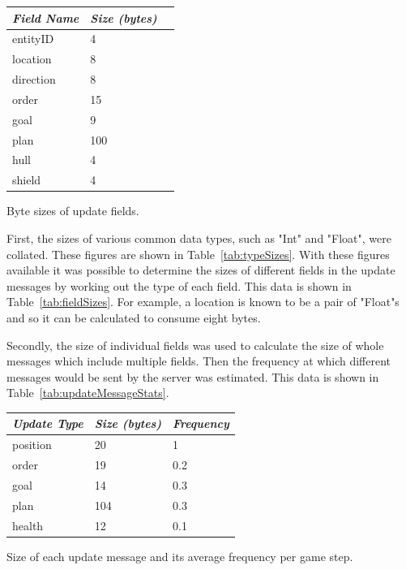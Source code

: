 \begin{margintable}
    \begin{tabular}{p{5em} p{5em} p{5em}}
    \toprule
    \emph{Field Name} & \emph{Size (bytes)} \\
    \midrule
    entityID & 4 \\ 
    location & 8 \\
    direction & 8 \\ 
    order & 15 \\
    goal & 9 \\ 
    plan & 100 \\ 
    hull & 4  \\ 
    shield & 4  \\  
    \bottomrule
    \end{tabular}
    	\vspace{1em}
	\caption[Byte sizes of update fields]{Byte sizes of update fields.}
	\label{tab:fieldSizes}
\end{margintable}

First, the sizes of various common data types, such as "Int" and "Float", were collated. These figures are shown in Table~\ref{tab:typeSizes}. With these figures available it was possible to determine the sizes of different fields in the update messages by working out the type of each field. This data is shown in Table~\ref{tab:fieldSizes}. For example, a location is known to be a pair of "Float"s and so it can be calculated to consume eight bytes.


Secondly, the size of individual fields was used to calculate the size of whole messages which include multiple fields. Then the frequency at which different messages would be sent by the server was estimated. This data is shown in Table~\ref{tab:updateMessageStats}.

\begin{margintable}
    \begin{tabular}{p{5em} p{5em} p{5em}}
    \toprule
    \emph{Update Type} & \emph{Size (bytes)} & \emph{Frequency} \\
    \midrule
    position & 20 & 1 \\ 
    order & 19 & 0.2 \\
    goal & 14 & 0.3 \\
    plan & 104 & 0.3 \\
    health & 12 & 0.1 \\   
    \bottomrule
    \end{tabular}
    	\vspace{1em}
	\caption[Size and frequency of update messages]{Size of each update message and its average frequency per game step.}
	\label{tab:updateMessageStats}
\end{margintable}

